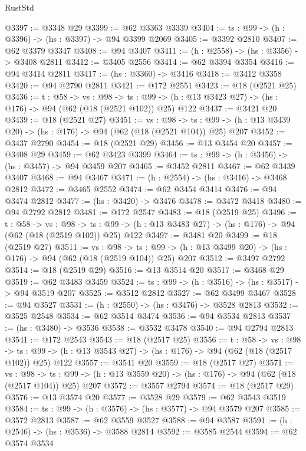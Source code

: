\begin{lexlean}{RustStd}
\begin{coremodule}
@3397 := @3348 @29
@3399 := @62 @3363 @3339
@3404 := {ts : @99} -> (h : @3396) -> (hs : @3397) -> @94 @3399 @2069
@3405 := @3392 @2810
@3407 := @62 @3379 @3347
@3408 := @94 @3407
@3411 := (h : @2558) -> (hs : @3356) -> @3408 @2811
@3412 := @3405 @2556
@3414 := @62 @3394 @3354
@3416 := @94 @3414 @2811
@3417 := (hs : @3360) -> @3416
@3418 := @3412 @3358
@3420 := @94 @2790 @2811
@3421 := @172 @2551
@3423 := @18 (@2521 @25)
@3436 := {t : @58} ->
  {vs : @98} ->
  {ts : @99} -> (h : @13 @3423 @27) -> (hs : @176) -> @94 (@62 (@18 (@2521 @102)) @25) @122
@3437 := @3421 @20
@3439 := @18 (@2521 @27)
@3451 := {vs : @98} ->
  {ts : @99} -> (h : @13 @3439 @20) -> (hs : @176) -> @94 (@62 (@18 (@2521 @104)) @25) @207
@3452 := @3437 @2790
@3454 := @18 (@2521 @29)
@3456 := @13 @3454 @20
@3457 := @3408 @29
@3459 := @62 @3423 @3399
@3464 := {ts : @99} -> (h : @3456) -> (hs : @3457) -> @94 @3459 @207
@3465 := @3452 @2811
@3467 := @62 @3439 @3407
@3468 := @94 @3467
@3471 := (h : @2554) -> (hs : @3416) -> @3468 @2812
@3472 := @3465 @2552
@3474 := @62 @3454 @3414
@3476 := @94 @3474 @2812
@3477 := (hs : @3420) -> @3476
@3478 := @3472 @3418
@3480 := @94 @2792 @2812
@3481 := @172 @2547
@3483 := @18 (@2519 @25)
@3496 := {t : @58} ->
  {vs : @98} ->
  {ts : @99} -> (h : @13 @3483 @27) -> (hs : @176) -> @94 (@62 (@18 (@2519 @102)) @25) @122
@3497 := @3481 @20
@3499 := @18 (@2519 @27)
@3511 := {vs : @98} ->
  {ts : @99} -> (h : @13 @3499 @20) -> (hs : @176) -> @94 (@62 (@18 (@2519 @104)) @25) @207
@3512 := @3497 @2792
@3514 := @18 (@2519 @29)
@3516 := @13 @3514 @20
@3517 := @3468 @29
@3519 := @62 @3483 @3459
@3524 := {ts : @99} -> (h : @3516) -> (hs : @3517) -> @94 @3519 @207
@3525 := @3512 @2812
@3527 := @62 @3499 @3467
@3528 := @94 @3527
@3531 := (h : @2550) -> (hs : @3476) -> @3528 @2813
@3532 := @3525 @2548
@3534 := @62 @3514 @3474
@3536 := @94 @3534 @2813
@3537 := (hs : @3480) -> @3536
@3538 := @3532 @3478
@3540 := @94 @2794 @2813
@3541 := @172 @2543
@3543 := @18 (@2517 @25)
@3556 := {t : @58} ->
  {vs : @98} ->
  {ts : @99} -> (h : @13 @3543 @27) -> (hs : @176) -> @94 (@62 (@18 (@2517 @102)) @25) @122
@3557 := @3541 @20
@3559 := @18 (@2517 @27)
@3571 := {vs : @98} ->
  {ts : @99} -> (h : @13 @3559 @20) -> (hs : @176) -> @94 (@62 (@18 (@2517 @104)) @25) @207
@3572 := @3557 @2794
@3574 := @18 (@2517 @29)
@3576 := @13 @3574 @20
@3577 := @3528 @29
@3579 := @62 @3543 @3519
@3584 := {ts : @99} -> (h : @3576) -> (hs : @3577) -> @94 @3579 @207
@3585 := @3572 @2813
@3587 := @62 @3559 @3527
@3588 := @94 @3587
@3591 := (h : @2546) -> (hs : @3536) -> @3588 @2814
@3592 := @3585 @2544
@3594 := @62 @3574 @3534

\end{coremodule}
\end{lexlean}
